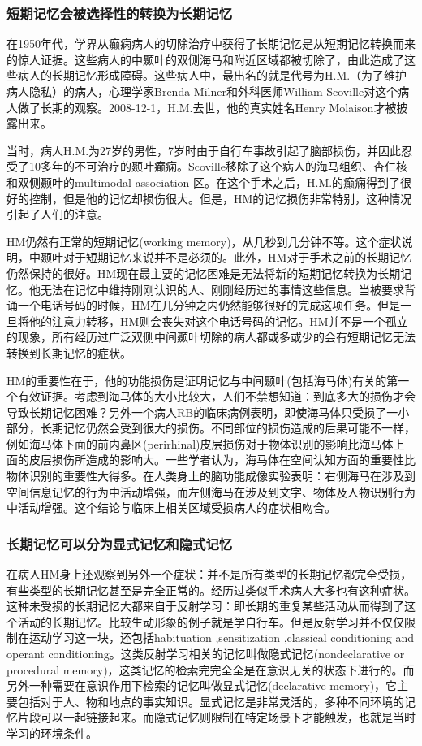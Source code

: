 \documentclass[UTF8,nofonts]{ctexart}
\begin{document}
\subsubsection{短期记忆会被选择性的转换为长期记忆}
在1950年代，学界从癫痫病人的切除治疗中获得了长期记忆是从短期记忆转换而来的惊人证据。这些病人的中颞叶的双侧海马和附近区域都被切除了，由此造成了这些病人的长期记忆形成障碍。这些病人中，最出名的就是代号为H.M.（为了维护病人隐私）的病人，心理学家Brenda Milner和外科医师William Scoville对这个病人做了长期的观察。2008-12-1，H.M.去世，他的真实姓名Henry Molaison才被披露出来。
\par
当时，病人H.M.为27岁的男性，7岁时由于自行车事故引起了脑部损伤，并因此忍受了10多年的不可治疗的颞叶癫痫。Scoville移除了这个病人的海马组织、杏仁核和双侧颞叶的multimodal association 区。在这个手术之后，H.M.的癫痫得到了很好的控制，但是他的记忆却损伤很大。但是，HM的记忆损伤非常特别，这种情况引起了人们的注意。
\par
HM仍然有正常的短期记忆(working memory)，从几秒到几分钟不等。这个症状说明，中颞叶对于短期记忆来说并不是必须的。此外，HM对于手术之前的长期记忆仍然保持的很好。HM现在最主要的记忆困难是无法将新的短期记忆转换为长期记忆。他无法在记忆中维持刚刚认识的人、刚刚经历过的事情这些信息。当被要求背诵一个电话号码的时候，HM在几分钟之内仍然能够很好的完成这项任务。但是一旦将他的注意力转移，HM则会丧失对这个电话号码的记忆。HM并不是一个孤立的现象，所有经历过广泛双侧中间颞叶切除的病人都或多或少的会有短期记忆无法转换到长期记忆的症状。
\par
HM的重要性在于，他的功能损伤是证明记忆与中间颞叶(包括海马体)有关的第一个有效证据。考虑到海马体的大小比较大，人们不禁想知道：到底多大的损伤才会导致长期记忆困难？另外一个病人RB的临床病例表明，即使海马体只受损了一小部分，长期记忆仍然会受到很大的损伤。不同部位的损伤造成的后果可能不一样，例如海马体下面的前内鼻区(perirhinal)皮层损伤对于物体识别的影响比海马体上面的皮层损伤所造成的影响大。一些学者认为，海马体在空间认知方面的重要性比物体识别的重要性大得多。在人类身上的脑功能成像实验表明：右侧海马在涉及到空间信息记忆的行为中活动增强，而左侧海马在涉及到文字、物体及人物识别行为中活动增强。这个结论与临床上相关区域受损病人的症状相吻合。
\subsubsection{长期记忆可以分为显式记忆和隐式记忆}
在病人HM身上还观察到另外一个症状：并不是所有类型的长期记忆都完全受损，有些类型的长期记忆甚至是完全正常的。经历过类似手术病人大多也有这种症状。这种未受损的长期记忆大都来自于反射学习：即长期的重复某些活动从而得到了这个活动的长期记忆。比较生动形象的例子就是学自行车。但是反射学习并不仅仅限制在运动学习这一块，还包括habituation ,sensitization ,classical conditioning and operant conditioning。这类反射学习相关的记忆叫做隐式记忆(nondeclarative or procedural memory)，这类记忆的检索完完全全是在意识无关的状态下进行的。而另外一种需要在意识作用下检索的记忆叫做显式记忆(declarative memory)，它主要包括对于人、物和地点的事实知识。显式记忆是非常灵活的，多种不同环境的记忆片段可以一起链接起来。而隐式记忆则限制在特定场景下才能触发，也就是当时学习的环境条件。
\end{document}
